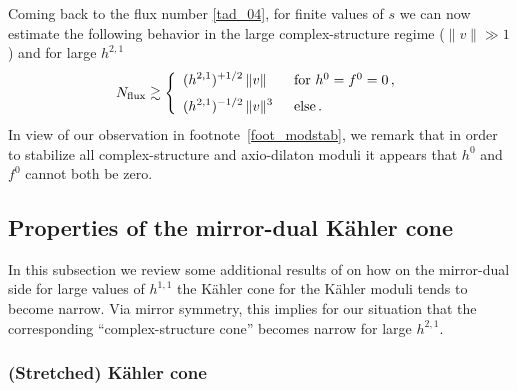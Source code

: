 \documentclass[12pt,a4paper]{article}
\newcommand{\eq}[1]{\begin{equation}
                     \begin{split} #1 \end{split}
                     \end{equation}}
\numberwithin{equation}{section}
\begin{document}
Coming back to the flux number \eqref{tad_04}, 
for finite values of $s$
we can now estimate the following behavior
in the large complex-structure regime ($\lVert v \rVert \gg 1$) and for large $h^{2,1}$ 
\eq{
\label{scaling_838}
   N_{\rm flux} \gtrsim \left\{
  \begin{array}{l@{\hspace{15pt}}l}
   \displaystyle (h^{2,1})^{+1/2} \,\lVert v\rVert & \mbox{for $h^0=f^0=0$}\,,
   \\[6pt]
   \displaystyle (h^{2,1})^{-1/2} \, \lVert v\rVert^3 & \mbox{else} \,.
   \end{array}
   \right.
}
In view of our observation in footnote~\ref{foot_modstab}, we remark that in order to 
stabilize all complex-structure and axio-dilaton moduli it appears that $h^0$ and $f^0$ cannot both be zero.







\subsection{Properties of the mirror-dual K\"ahler cone}
\label{sec_prop_cone}

In this subsection we review some additional results of \cite{Demirtas:2018akl} on how 
on the mirror-dual side
for large values of 
$h^{1,1}$ the K\"ahler cone for the K\"ahler moduli tends to become narrow.
Via  mirror symmetry, this implies for our situation that the corresponding ``complex-structure cone'' becomes
narrow for large $h^{2,1}$. 


\subsubsection*{(Stretched) K\"ahler cone}
\end{document}
